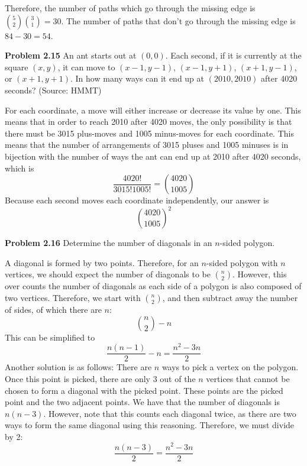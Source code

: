 \documentclass[11pt]{scrartcl}
\begin{document}
\begin{center}
{}
\end{center}
\noindent 
Therefore, the number of paths which go through the missing edge is ${5 \choose 2}{3 \choose 1}=30$. The number of paths that don't go through the missing edge is $84-30=54$.
\begin{tcolorbox}
\textbf{Problem 2.15} An ant starts out at $(0, 0)$. Each second, if it is currently at the square $(x, y)$, it can move to
$(x − 1, y − 1)$, $(x − 1, y + 1)$, $(x + 1, y − 1)$, or $(x + 1, y + 1)$. In how many ways can it end up at
$(2010, 2010)$ after 4020 seconds? (Source: HMMT) 
\end{tcolorbox}
\noindent 
For each coordinate, a move will either increase or decrease its value by one. This means that in order to reach 2010 after 4020 moves, the only possibility is that there must be 3015 plus-moves and 1005 minus-moves for each coordinate. This means that the number of arrangements of 3015 pluses and 1005 minuses is in bijection with the number of ways the ant can end up at 2010 after 4020 seconds, which is
$$\frac{4020!}{3015!1005!}={4020 \choose 1005}$$
Because each second moves each coordinate independently, our answer is 
$${4020 \choose 1005}^2$$
\begin{tcolorbox}
\textbf{Problem 2.16} Determine the number of diagonals in an $n$-sided polygon. 
\end{tcolorbox}
\noindent 
A diagonal is formed by two points. Therefore, for an $n$-sided polygon with $n$ vertices, we should expect the number of diagonals to be $n \choose 2$. However, this over counts the number of diagonals as each side of a polygon is also composed of two vertices. Therefore, we start with $n \choose 2$, and then subtract away the number of sides, of which there are $n$:
$${n \choose 2}-n$$
This can be simplified to 
$$\frac{n(n-1)}{2}-n = \frac{n^2-3n}{2}$$
Another solution is as follows: There are $n$ ways to pick a vertex on the polygon. Once this point is picked, there are only 3 out of the $n$ vertices that cannot be chosen to form a diagonal with the picked point. These points are the picked point and the two adjacent points. We have that the number of diagonals is $n(n-3)$. However, note that this counts each diagonal twice, as there are two ways to form the same diagonal using this reasoning. Therefore, we must divide by 2: 
$$\frac{n(n-3)}{2}=\frac{n^2-3n}{2}$$
\end{document}
